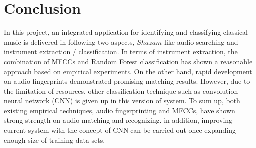 \documentclass[whitelogo,12pt]{tudelft-report}
\begin{document}
\chapter{Conclusion}
In this project, an integrated application for identifying and classifying classical music is delivered in following two aspects, $Shazam$-like audio searching and instrument extraction / classification. In terms of instrument extraction, the combination of MFCCs and Random Forest classification has shown a reasonable approach based on empirical experiments. On the other hand, rapid development on audio fingerprints demonstrated promising matching results. However, due to the limitation of resources, other classification technique such as convolution neural network (CNN) is given up in this version of system. To sum up, both existing empirical techniques, audio fingerprinting and MFCCs, have shown strong strength on audio matching and recognizing. in addition, improving current system with the concept of CNN can be carried out once expanding enough size of training data sets.




\appendix
%


\end{document}
